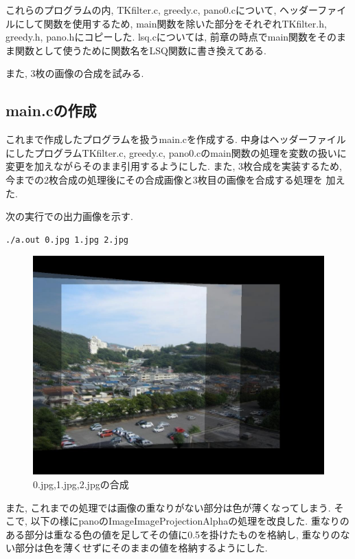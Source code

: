 \documentclass[a4j]{jarticle}
\begin{document}
これらのプログラムの内, TKfilter.c, greedy.c, pano0.cについて, ヘッダーファイルにして関数を使用するため, main関数を除いた部分をそれぞれTKfilter.h, greedy.h, pano.hにコピーした. 
lsq.cについては, 前章の時点でmain関数をそのまま関数として使うために関数名をLSQ関数に書き換えてある.

また, 3枚の画像の合成を試みる.

\subsection{main.cの作成}
これまで作成したプログラムを扱うmain.cを作成する.
中身はヘッダーファイルにしたプログラムTKfilter.c, greedy.c, pano0.cのmain関数の処理を変数の扱いに変更を加えながらそのまま引用するようにした. 
また, 3枚合成を実装するため, 今までの2枚合成の処理後にその合成画像と3枚目の画像を合成する処理を
加えた. 

次の実行での出力画像を示す.
\begin{verbatim}
./a.out 0.jpg 1.jpg 2.jpg
\end{verbatim}

\begin{figure}[h]
\begin{center}
\includegraphics[bb=0 0 1024 768,scale=.3]{test.jpg}
\caption{0.jpg,1.jpg,2.jpgの合成}
\label{薄めない}
\end{center}
\end{figure}
\newpage
また, これまでの処理では画像の重なりがない部分は色が薄くなってしまう. 
そこで, 以下の様にpanoのImageImageProjectionAlphaの処理を改良した. 重なりのある部分は重なる色の値を足してその値に0.5を掛けたものを格納し, 重なりのない部分は色を薄くせずにそのままの値を格納するようにした.
\end{document}

